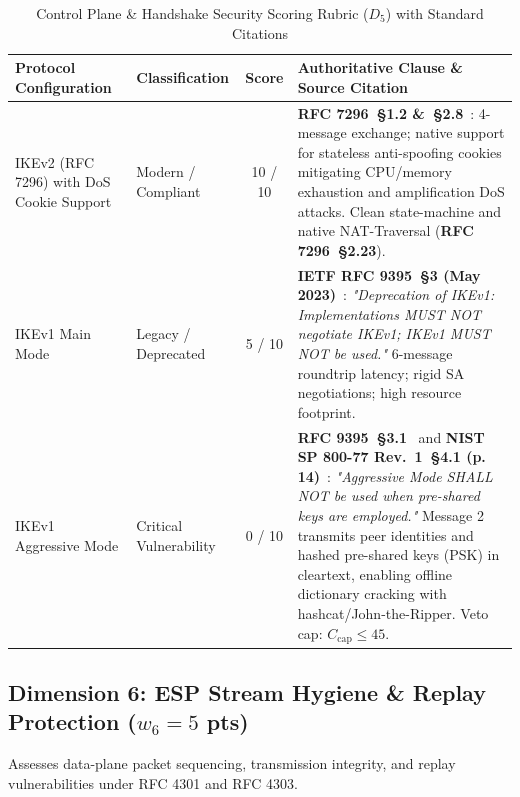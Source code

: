 \documentclass[11pt,a4paper]{article}
\begin{document}
\begin{table}[h!]
\centering
\small
\begin{tabularx}{\textwidth}{llcX}
\toprule
\textbf{Protocol Configuration} & \textbf{Classification} & \textbf{Score} & \textbf{Authoritative Clause \& Source Citation} \\
\midrule
IKEv2 (RFC 7296) with DoS Cookie Support & Modern / Compliant & 10 / 10 & \textbf{RFC 7296~\S 1.2 \&~\S 2.8}~\cite{rfc7296}: 4-message exchange; native support for stateless anti-spoofing cookies mitigating CPU/memory exhaustion and amplification DoS attacks. Clean state-machine and native NAT-Traversal (\textbf{RFC 7296~\S 2.23}). \\
\addlinespace
IKEv1 Main Mode & Legacy / Deprecated & 5 / 10 & \textbf{IETF RFC 9395~\S 3 (May 2023)}~\cite{rfc9395}: \textit{"Deprecation of IKEv1: Implementations MUST NOT negotiate IKEv1; IKEv1 MUST NOT be used."} 6-message roundtrip latency; rigid SA negotiations; high resource footprint. \\
\addlinespace
IKEv1 Aggressive Mode & Critical Vulnerability & 0 / 10 & \textbf{RFC 9395~\S 3.1}~\cite{rfc9395} and \textbf{NIST SP 800-77 Rev.~1~\S 4.1 (p. 14)}~\cite{nist800-77r1}: \textit{"Aggressive Mode SHALL NOT be used when pre-shared keys are employed."} Message 2 transmits peer identities and hashed pre-shared keys (PSK) in cleartext, enabling offline dictionary cracking with hashcat/John-the-Ripper. Veto cap: $C_{\text{cap}} \le 45$. \\
\bottomrule
\end{tabularx}
\caption{Control Plane \& Handshake Security Scoring Rubric ($D_5$) with Standard Citations}
\label{tab:d5}
\end{table}

\subsection{Dimension 6: ESP Stream Hygiene \& Replay Protection ($w_6 = 5$ pts)}
Assesses data-plane packet sequencing, transmission integrity, and replay vulnerabilities under RFC 4301 and RFC 4303.
\end{document}
